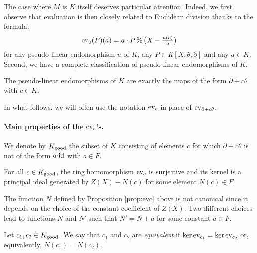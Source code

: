 \documentclass[a4paper]{llncs}
\newcommand{\id}{\textrm{\rm id}}
\newcommand{\ev}[1]{\textrm{\rm ev}_{#1}}
\renewcommand{\mod}{\,\%\,}
\newcommand{\good}{\textrm{\rm good}}
\begin{document}
The case where $M$ is $K$ itself deserves particular attention.
Indeed, we first observe that evaluation is then closely related to
Euclidean division thanks to the formula:
\begin{equation}
\label{eq:evanddiv}
\textstyle \ev{u}(P)(a) = 
a \cdot P \mod \big(X - \frac{u(a)}{a}\big)
\end{equation}
for any pseudo-linear endomorphism $u$ of $K$, any $P \in K[X;\theta,
\partial]$ and any $a \in K$. Second, we have a complete classification
of pseudo-linear endomorphisms of $K$.

\begin{proposition}
The pseudo-linear endomorphisms of $K$ are exactly the maps of
the form $\partial + c\theta$ with $c \in K$.
\end{proposition}

In what follows, we will often use the notation $\ev c$ in place of 
$\ev{\partial + c \theta}$.

\paragraph{Main properties of the $\ev c$'s.}

We denote by $K_\good$ the subset of $K$ consisting of elements $c$ for 
which $\partial + c\theta$ is not of the form $a{\cdot}\id$ with $a \in 
F$.

\begin{proposition}
\label{prop:evc}
For all $c \in K_\good$, the ring homomorphism $\ev{c}$ is surjective
and its kernel is a principal ideal generated by $Z(X) - N(c)$
for some element $N(c) \in F$.
\end{proposition}

\begin{remark}
The function $N$ defined by Proposition \ref{prop:evc} above is not 
canonical since it depends on the choice of the constant coefficient 
of $Z(X)$. Two different choices lead to functions $N$ and $N'$ such
that $N' = N + a$ for some constant $a \in F$.
\end{remark}


\begin{definition}
\label{def:equiv}
Let $c_1, c_2 \in K_\good$.
We say that $c_1$ and $c_2$ are \emph{equivalent} if
$\ker \ev{c_1} = \ker \ev{c_2}$ or, equivalently, $N(c_1) = N(c_2)$.
\end{definition}
\end{document}
